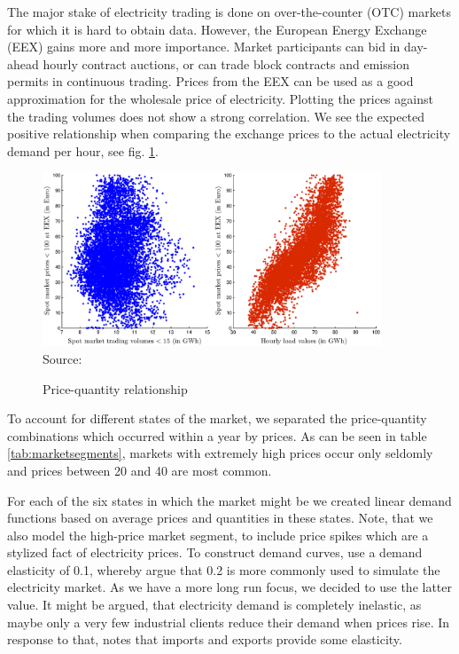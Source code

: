 The major stake of electricity trading is done on over-the-counter (OTC) markets for which it is hard to obtain data. However, the European Energy Exchange (EEX) gains more and more importance. Market participants can bid in day-ahead hourly contract auctions, or can trade block contracts and emission permits in continuous trading. Prices from the EEX can be used as a good approximation for the wholesale price of electricity. Plotting the prices against the trading volumes does not show a strong correlation. We see the expected positive relationship when comparing the exchange prices to the actual electricity demand per hour, see fig. \ref{fig:pricequant}.

\begin{figure}[htb]
  \centering
\caption{Price-quantity relationship}
  \includegraphics[width=0.9\textwidth]{pricequant}
  \label{fig:pricequant}
\\
 \scriptsize Source: \cite{EEX2006, UCTE2006}
\end{figure}

To account for different states of the market, we separated the price-quantity combinations which occurred within a year by prices. As can be seen in table \ref{tab:marketsegments}, markets with extremely high prices occur only seldomly and prices between 20 and 40 are most common.

For each of the six states in which the market might be we created linear demand functions based on average prices and quantities in these states. Note, that we also model the high-price market segment, to include price spikes which are a stylized fact of electricity prices.  To construct demand curves, \cite{Neuhoff2005} use a demand elasticity of 0.1, whereby \cite{Genc2007} argue that 0.2 is more commonly used to simulate the electricity market. As we have a more long run focus, we decided to use the latter value. It might be argued, that electricity demand is completely inelastic, as maybe only a very few industrial clients reduce their demand when prices rise. In response to that, \cite{Bushnell2003} notes that imports and exports provide some elasticity.

